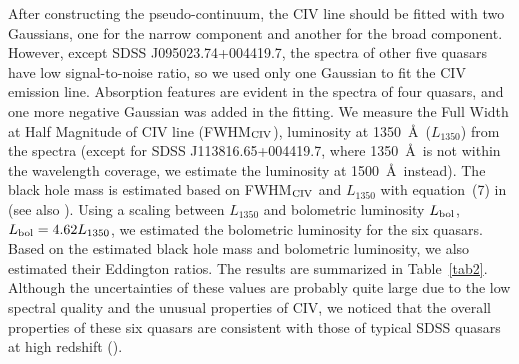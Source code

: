 \documentclass[referee]{raa}
\begin{document}
After constructing the pseudo-continuum, the CIV line should be fitted with two Gaussians, one for the narrow component and another for the broad component. However, except SDSS J095023.74+004419.7,  the spectra of other five quasars have low signal-to-noise ratio, so we used only one Gaussian to fit the CIV emission line. Absorption features are evident in the spectra of four quasars, and one more negative Gaussian was added in the fitting.
We measure the Full Width at Half Magnitude
of CIV line (FWHM$_{\rm CIV}$), luminosity at 1350~\AA\ ($L_{1350}$) from the spectra (except for
SDSS J113816.65+004419.7, where 1350~\AA\ is not within the wavelength coverage, we estimate the luminosity at 1500~\AA\
instead). The black hole mass is estimated based on FWHM$_{\rm CIV}$ and $L_{1350}$  with equation~(7) in \citet{Vestergaard+Peterson+2006}(see also \citealt{Kong+etal+2006}). Using a scaling between $L_{1350}$ and bolometric luminosity
$L_{\rm bol}$, $L_{\rm bol}=4.62L_{1350}$, we estimated the bolometric luminosity for the six quasars.
Based on the estimated black hole mass and bolometric luminosity, we also estimated their Eddington ratios.
The results are summarized in Table~\ref{tab2}.
Although the uncertainties of these values are probably quite large due to the low spectral quality and
the unusual properties of CIV, we noticed that the overall properties of these six quasars are consistent with those of typical SDSS quasars at high redshift (\citealt{Shen+etal+2011}).
\end{document}
